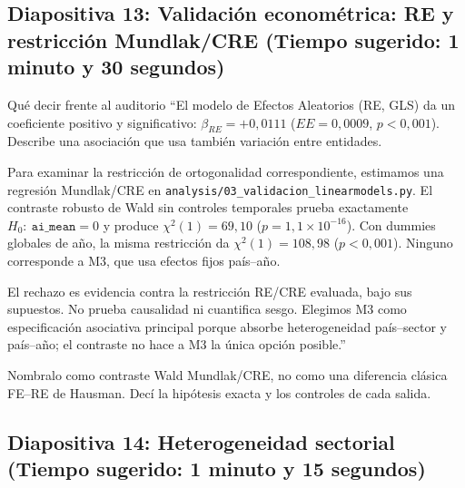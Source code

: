\documentclass[11pt,a4paper]{article}
\begin{document}
\subsection*{Diapositiva 13: Validación econométrica: RE y restricción Mundlak/CRE (Tiempo sugerido: 1 minuto y 30 segundos)}

\begin{speechbox}{Qué decir frente al auditorio}
``El modelo de Efectos Aleatorios (RE, GLS) da un coeficiente positivo y significativo: $\beta_{RE}=+0{,}0111$ ($EE=0{,}0009$, $p<0{,}001$). Describe una asociación que usa también variación entre entidades.

Para examinar la restricción de ortogonalidad correspondiente, estimamos una regresión Mundlak/CRE en \texttt{analysis/03\_validacion\_linearmodels.py}. El contraste robusto de Wald sin controles temporales prueba exactamente $H_0:\ \texttt{ai\_mean}=0$ y produce $\chi^2(1)=69{,}10$ ($p=1{,}1\times10^{-16}$). Con dummies globales de año, la misma restricción da $\chi^2(1)=108{,}98$ ($p<0{,}001$). Ninguno corresponde a M3, que usa efectos fijos país--año.

El rechazo es evidencia contra la restricción RE/CRE evaluada, bajo sus supuestos. No prueba causalidad ni cuantifica sesgo. Elegimos M3 como especificación asociativa principal porque absorbe heterogeneidad país--sector y país--año; el contraste no hace a M3 la única opción posible.''
\end{speechbox}

\begin{tipbox}
Nombralo como contraste Wald Mundlak/CRE, no como una diferencia clásica FE--RE de Hausman. Decí la hipótesis exacta y los controles de cada salida.
\end{tipbox}

\subsection*{Diapositiva 14: Heterogeneidad sectorial (Tiempo sugerido: 1 minuto y 15 segundos)}
\end{document}
